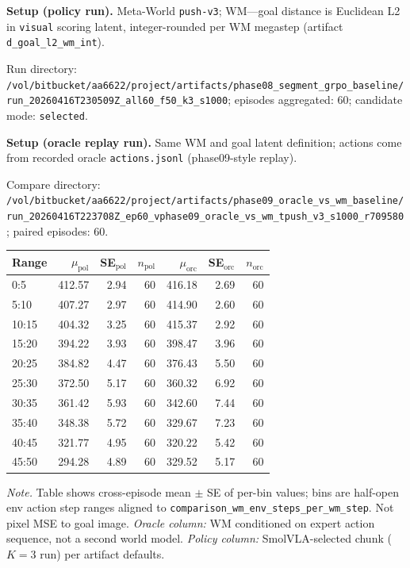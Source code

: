 \documentclass{article}
\begin{document}
\par\smallskip
\nopagebreak[4]
\begin{minipage}{\linewidth}
\raggedright

\noindent\textbf{Setup (policy run).} Meta-World \texttt{push-v3}; WM---goal distance is Euclidean L2 in \texttt{visual} scoring latent, integer-rounded per WM megastep (artifact \texttt{d\_goal\_l2\_wm\_int}).

Run directory: \texttt{/vol/bitbucket/aa6622/project/artifacts/phase08\_segment\_grpo\_baseline/run\_20260416T230509Z\_all60\_f50\_k3\_s1000}; episodes aggregated: 60; candidate mode: \texttt{selected}.

\noindent\textbf{Setup (oracle replay run).} Same WM and goal latent definition; actions come from recorded oracle \texttt{actions.jsonl} (phase09-style replay).

Compare directory: \texttt{/vol/bitbucket/aa6622/project/artifacts/phase09\_oracle\_vs\_wm\_baseline/run\_20260416T223708Z\_ep60\_vphase09\_oracle\_vs\_wm\_tpush\_v3\_s1000\_r709580}; paired episodes: 60.

\begin{center}
\begin{tabular}{lrrrrrr}
\hline
Range & $\mu_{\mathrm{pol}}$ & SE$_{\mathrm{pol}}$ & $n_{\mathrm{pol}}$ & $\mu_{\mathrm{orc}}$ & SE$_{\mathrm{orc}}$ & $n_{\mathrm{orc}}$ \\
\hline
0:5 &  412.57 &  2.94 & 60 &  416.18 &  2.69 & 60 \\
5:10 &  407.27 &  2.97 & 60 &  414.90 &  2.60 & 60 \\
10:15 &  404.32 &  3.25 & 60 &  415.37 &  2.92 & 60 \\
15:20 &  394.22 &  3.93 & 60 &  398.47 &  3.96 & 60 \\
20:25 &  384.82 &  4.47 & 60 &  376.43 &  5.50 & 60 \\
25:30 &  372.50 &  5.17 & 60 &  360.32 &  6.92 & 60 \\
30:35 &  361.42 &  5.93 & 60 &  342.60 &  7.44 & 60 \\
35:40 &  348.38 &  5.72 & 60 &  329.67 &  7.23 & 60 \\
40:45 &  321.77 &  4.95 & 60 &  320.22 &  5.42 & 60 \\
45:50 &  294.28 &  4.89 & 60 &  329.52 &  5.17 & 60 \\
\hline
\end{tabular}
\end{center}

\medskip
\noindent\footnotesize\textit{Note.} Table shows cross-episode mean $\pm$ SE of per-bin values; bins are half-open env action step ranges aligned to \texttt{comparison\_wm\_env\_steps\_per\_wm\_step}. Not pixel MSE to goal image.
\noindent\footnotesize\textit{Oracle column:} WM conditioned on expert action sequence, not a second world model.
\noindent\footnotesize\textit{Policy column:} SmolVLA-selected chunk ($K{=}3$ run) per artifact defaults.

\end{minipage}
\end{document}
